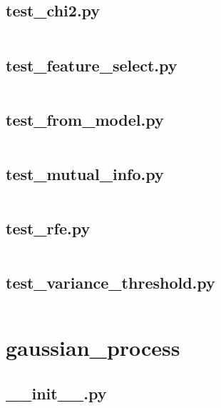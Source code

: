 \documentclass{article}
\begin{document}
\subsection{test\_chi2.py}
\inputminted{python}{/home/dufferzafar/dev/@clones/scikit-learn/sklearn/feature_selection/tests/test_chi2.py}
\newpage

\subsection{test\_feature\_select.py}
\inputminted{python}{/home/dufferzafar/dev/@clones/scikit-learn/sklearn/feature_selection/tests/test_feature_select.py}
\newpage

\subsection{test\_from\_model.py}
\inputminted{python}{/home/dufferzafar/dev/@clones/scikit-learn/sklearn/feature_selection/tests/test_from_model.py}
\newpage

\subsection{test\_mutual\_info.py}
\inputminted{python}{/home/dufferzafar/dev/@clones/scikit-learn/sklearn/feature_selection/tests/test_mutual_info.py}
\newpage

\subsection{test\_rfe.py}
\inputminted{python}{/home/dufferzafar/dev/@clones/scikit-learn/sklearn/feature_selection/tests/test_rfe.py}
\newpage

\subsection{test\_variance\_threshold.py}
\inputminted{python}{/home/dufferzafar/dev/@clones/scikit-learn/sklearn/feature_selection/tests/test_variance_threshold.py}
\newpage

\section{gaussian\_process}

\subsection{\_\_init\_\_.py}
\inputminted{python}{/home/dufferzafar/dev/@clones/scikit-learn/sklearn/gaussian_process/__init__.py}
\newpage
\end{document}
